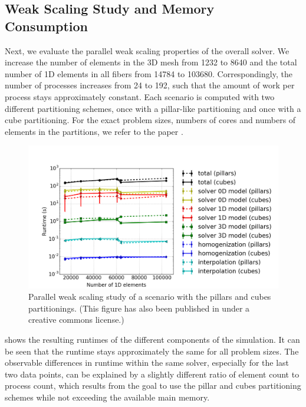 \subsection{Weak Scaling Study and Memory Consumption}\label{sec:opencmiss_memory}

Next, we evaluate the parallel weak scaling properties of the overall solver. We increase the number of elements in the 3D mesh from 1232 to 8640 and the total number of 1D elements in all fibers from \num{14784} to \num{103680}. Correspondingly, the number of processes increases from 24 to 192, such that the amount of work per process stays approximately constant. Each scenario is computed with two different partitioning schemes, once with a pillar-like partitioning and once with a cube partitioning. For the exact problem sizes, numbers of cores and numbers of elements in the partitions, we refer to the paper \cite{Bradley:2018:EDB}. 

\begin{figure}
  \centering%
  \includegraphics[width=\textwidth]{images/results/studies/opencmiss_weak_scaling.png}%
  \caption{Parallel weak scaling study of a scenario with the pillars and cubes partitionings.  \footnotesize(This figure has also been published in \cite{Bradley:2018:EDB} under a creative commons license.)}%
  \label{fig:opencmiss_weak_scaling}%
\end{figure}

 shows the resulting runtimes of the different components of the simulation. It can be seen that the runtime stays approximately the same for all problem sizes. The observable differences in runtime within the same solver, especially for the last two data points, can be explained by a slightly different ratio of element count to process count, which results from the goal to use the pillar and cubes partitioning schemes while not exceeding the available main memory.

